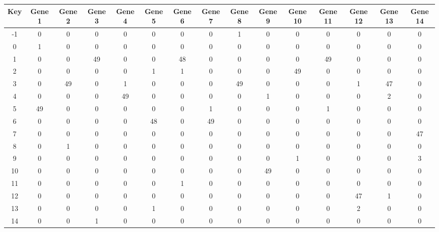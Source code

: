 \begin{tabular}{|c|c|c|c|c|c|c|c|c|c|c|c|c|c|c|}
\hline
Key & Gene 1 & Gene 2 & Gene 3 & Gene 4 & Gene 5 & Gene 6 & Gene 7 & Gene 8 & Gene 9 & Gene 10 & Gene 11 & Gene 12 & Gene 13 & Gene 14 \\
\hline
-1 & 0 & 0 & 0 & 0 & 0 & 0 & 0 & 1 & 0 & 0 & 0 & 0 & 0 & 0 \\
0 & 1 & 0 & 0 & 0 & 0 & 0 & 0 & 0 & 0 & 0 & 0 & 0 & 0 & 0 \\
1 & 0 & 0 & 49 & 0 & 0 & 48 & 0 & 0 & 0 & 0 & 49 & 0 & 0 & 0 \\
2 & 0 & 0 & 0 & 0 & 1 & 1 & 0 & 0 & 0 & 49 & 0 & 0 & 0 & 0 \\
3 & 0 & 49 & 0 & 1 & 0 & 0 & 0 & 49 & 0 & 0 & 0 & 1 & 47 & 0 \\
4 & 0 & 0 & 0 & 49 & 0 & 0 & 0 & 0 & 1 & 0 & 0 & 0 & 2 & 0 \\
5 & 49 & 0 & 0 & 0 & 0 & 0 & 1 & 0 & 0 & 0 & 1 & 0 & 0 & 0 \\
6 & 0 & 0 & 0 & 0 & 48 & 0 & 49 & 0 & 0 & 0 & 0 & 0 & 0 & 0 \\
7 & 0 & 0 & 0 & 0 & 0 & 0 & 0 & 0 & 0 & 0 & 0 & 0 & 0 & 47 \\
8 & 0 & 1 & 0 & 0 & 0 & 0 & 0 & 0 & 0 & 0 & 0 & 0 & 0 & 0 \\
9 & 0 & 0 & 0 & 0 & 0 & 0 & 0 & 0 & 0 & 1 & 0 & 0 & 0 & 3 \\
10 & 0 & 0 & 0 & 0 & 0 & 0 & 0 & 0 & 49 & 0 & 0 & 0 & 0 & 0 \\
11 & 0 & 0 & 0 & 0 & 0 & 1 & 0 & 0 & 0 & 0 & 0 & 0 & 0 & 0 \\
12 & 0 & 0 & 0 & 0 & 0 & 0 & 0 & 0 & 0 & 0 & 0 & 47 & 1 & 0 \\
13 & 0 & 0 & 0 & 0 & 1 & 0 & 0 & 0 & 0 & 0 & 0 & 2 & 0 & 0 \\
14 & 0 & 0 & 1 & 0 & 0 & 0 & 0 & 0 & 0 & 0 & 0 & 0 & 0 & 0 \\
\hline
\end{tabular}